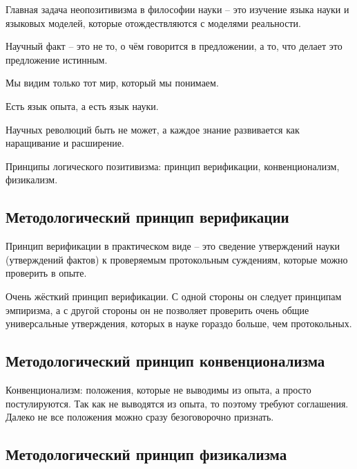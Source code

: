 \documentclass[main.tex]{subfiles}
\begin{document}
Главная задача неопозитивизма в философии науки -- это изучение языка науки и языковых моделей, которые отождествляются с моделями реальности.




Научный факт -- это не то, о чём говорится в предложении, а то, что делает это предложение истинным.

Мы видим только тот мир, который мы понимаем.

Есть язык опыта, а есть язык науки.

Научных революций быть не может, а каждое знание развивается как наращивание и расширение.

Принципы логического позитивизма: принцип верификации, конвенционализм, физикализм.

\subsection{Методологический принцип верификации}


Принцип верификации в практическом виде -- это сведение утверждений науки (утверждений фактов) к проверяемым протокольным суждениям, которые можно проверить в опыте.

Очень жёсткий принцип верификации.
С одной стороны он следует принципам эмпиризма, а с другой стороны он не позволяет проверить очень общие универсальные утверждения, которых в науке гораздо больше, чем протокольных.

\subsection{Методологический принцип конвенционализма}


Конвенционализм: положения, которые не выводимы из опыта, а просто постулируются.
Так как не выводятся из опыта, то поэтому требуют соглашения.
Далеко не все положения можно сразу безоговорочно признать.

\subsection{Методологический принцип физикализма}

\end{document}
